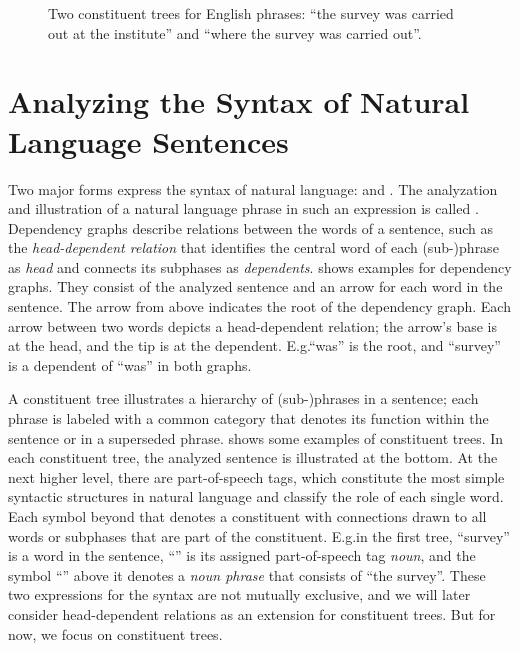 \documentclass[../document.tex]{subfiles}
\begin{document}
    \begin{figure}
        \null\hfill
        
        \hfill
        
        \hfill\null
        \caption{\label{fig:constituent}
            Two constituent trees for English phrases: ``the survey was carried out at the institute'' and ``where the survey was carried out''.
        }
    \end{figure}
    
    \section*{Analyzing the Syntax of Natural Language Sentences}
    Two major forms express the syntax of natural language:  and .
    The analyzation and illustration of a natural language phrase in such an expression is called .
    Dependency graphs describe relations between the words of a sentence, such as the \emph{head-dependent relation} that identifies the central word of each (sub-)phrase as \emph{head} and connects its subphases as \emph{dependents}. \citep[Section 18.1]{Jur23}
     shows examples for dependency graphs.
    They consist of the analyzed sentence and an arrow for each word in the sentence.
    The arrow from above indicates the root of the dependency graph.
    Each arrow between two words depicts a head-dependent relation; the arrow's base is at the head, and the tip is at the dependent.
    E.g.\@ ``was'' is the root, and ``survey'' is a dependent of ``was'' in both graphs. 
            
    A constituent tree illustrates a hierarchy of (sub-)phrases in a sentence; each phrase is labeled with a common category that denotes its function within the sentence or in a superseded phrase.
     shows some examples of constituent trees.
    In each constituent tree, the analyzed sentence is illustrated at the bottom.
    At the next higher level, there are part-of-speech tags, which constitute the most simple syntactic structures in natural language and classify the role of each single word.
    Each symbol beyond that denotes a constituent with connections drawn to all words or subphases that are part of the constituent.
    E.g.\@ in the first tree, ``survey'' is a word in the sentence, ``'' is its assigned part-of-speech tag \emph{noun}, and the symbol ``'' above it denotes a \emph{noun phrase} that consists of ``the survey''.
    These two expressions for the syntax are not mutually exclusive, and we will later consider head-dependent relations as an extension for constituent trees.
    But for now, we focus on constituent trees.
    
\end{document}
